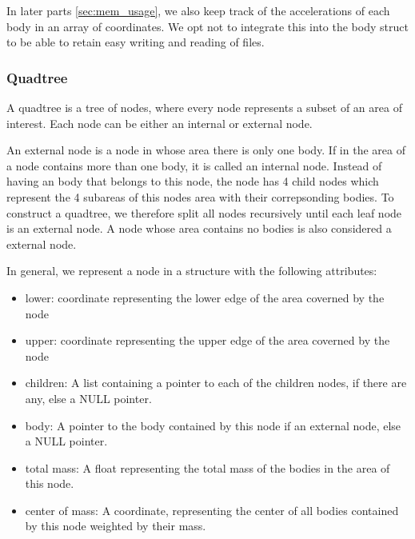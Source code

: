 \documentclass[a4paper]{scrartcl}
\begin{document}
            In later parts \ref{sec:mem_usage}, we also keep track of the
            accelerations of each body in an array of coordinates. We opt not to
            integrate this into the body struct to be able to retain easy writing
            and reading of files.

        \subsubsection{Quadtree}
            A quadtree is a tree of nodes, where every node represents a subset
            of an area of interest. Each node can be either an internal or external node.

            An external node is a node in whose area there is only one body. If
            in the area of a node contains more than one body, it is called an
            internal node. Instead of having an body that belongs to this node,
            the node has 4 child nodes which represent the 4 subareas of this
            nodes area with their correpsonding bodies. To construct a quadtree,
            we therefore split all nodes recursively until each leaf node is an
            external node. A node whose area contains no bodies is also
            considered a external node.

            In general, we represent a node in a structure with the following attributes:
            \begin{itemize}
                \item lower: coordinate representing the lower edge of the area coverned by the node
                \item upper: coordinate representing the upper edge of the area coverned by the node
                \item children: A list containing a pointer to each of the children nodes, if there are any, else a NULL pointer.
                \item body: A pointer to the body contained by this node if an external node, else a NULL pointer.
                \item total mass: A float representing the total mass of the bodies in the area of this node.
                \item center of mass: A coordinate, representing the center of all bodies contained by this node weighted by their mass.
            \end{itemize}
\end{document}
